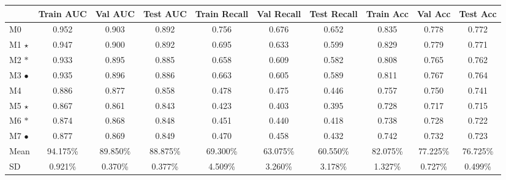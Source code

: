 \begin{landscape}

\begin{table}
\centering
\begin{tabular}{lccccccccc}
    \toprule
 & Train AUC & Val AUC &  Test AUC & Train Recall & Val Recall &  Test Recall & Train Acc & Val Acc & Test Acc \\
 \midrule
M0 & 0.952 & 0.903 & 0.892 & 0.756 & 0.676 & 0.652 & 0.835 & 0.778 & 0.772 \\
M1 $\star$ & 0.947 & 0.900 & 0.892 & 0.695 & 0.633 & 0.599 & 0.829 & 0.779 & 0.771 \\
M2 $\ast$ & 0.933 & 0.895 & 0.885 & 0.658 & 0.609 & 0.582 & 0.808 & 0.765 & 0.762 \\
M3 $\bullet$ & 0.935 & 0.896 & 0.886 & 0.663 & 0.605 & 0.589 & 0.811 & 0.767 & 0.764 \\
\midrule
\cellcolor{gray!50}M4 & \cellcolor{gray!50}0.886 & \cellcolor{gray!50}0.877 & \cellcolor{gray!50}0.858 & \cellcolor{gray!50}0.478 & \cellcolor{gray!50}0.475 & \cellcolor{gray!50}0.446 & \cellcolor{gray!50}0.757 & \cellcolor{gray!50}0.750 & \cellcolor{gray!50}0.741 \\
\cellcolor{gray!50}M5 $\star$ & \cellcolor{gray!50}0.867 & \cellcolor{gray!50}0.861 & \cellcolor{gray!50}0.843 & \cellcolor{gray!50}0.423 & \cellcolor{gray!50}0.403 & \cellcolor{gray!50}0.395 & \cellcolor{gray!50}0.728 & \cellcolor{gray!50}0.717 &  \cellcolor{gray!50}0.715 \\
\cellcolor{gray!50}M6 $\ast$ & \cellcolor{gray!50}0.874 & \cellcolor{gray!50}0.868 & \cellcolor{gray!50}0.848 & \cellcolor{gray!50}0.451 & \cellcolor{gray!50}0.440 & \cellcolor{gray!50}0.418 & \cellcolor{gray!50}0.738 & \cellcolor{gray!50}0.728 &  \cellcolor{gray!50}0.722 \\
\cellcolor{gray!50}M7 $\bullet$ & \cellcolor{gray!50}0.877 & \cellcolor{gray!50}0.869 & \cellcolor{gray!50}0.849 & \cellcolor{gray!50}0.470 & \cellcolor{gray!50}0.458 & \cellcolor{gray!50}0.432 & \cellcolor{gray!50}0.742 & \cellcolor{gray!50}0.732 &  \cellcolor{gray!50}0.723 \\

\midrule

  Mean &  94.175\% & 89.850\% & 88.875\%  & 69.300\% & 63.075\% & 60.550\% & 82.075\% & 77.225\% & 76.725\% \\
  SD   & 0.921\% & 0.370\% & 0.377\%  &  4.509\% & 3.260\% & 3.178\% & 1.327\% & 0.727\% & 0.499\% \\


\end{tabular}
\end{table}
\end{landscape}
